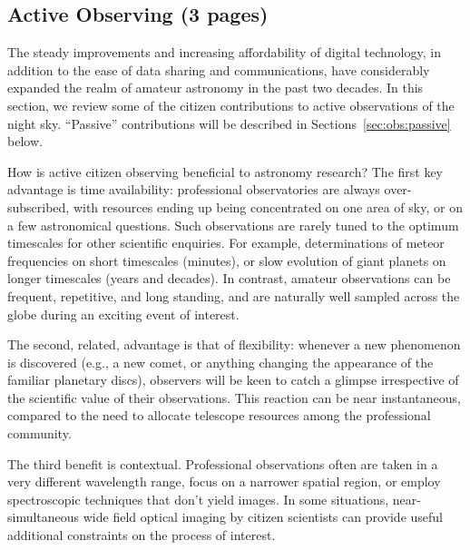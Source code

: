 \documentclass{ar2e}
\begin{document}
\subsection{Active Observing (3 pages)}
\label{sec:obs:active}

The steady improvements and increasing affordability of digital technology, in
addition to the ease of data sharing and communications, have considerably
expanded the realm of amateur astronomy in the past two decades.  
In this section, we review some of the citizen contributions to active
observations of the night sky.  ``Passive'' contributions 
will be described in Sections~\ref{sec:obs:passive} below.

How is active citizen observing beneficial to astronomy research?  The first
key advantage is time availability: professional observatories are always
over-subscribed, with resources ending up being concentrated on one area of
sky, or on a few astronomical questions.  Such observations are rarely tuned
to the optimum timescales for other scientific enquiries. For example,
determinations of meteor frequencies on short timescales (minutes), or slow
evolution of giant planets on longer timescales (years and decades).  In
contrast, amateur observations can be frequent, repetitive, and long standing,
and are naturally well sampled across the globe during an exciting event of
interest. 

The second, related, advantage is that of flexibility: whenever a new phenomenon
is discovered (e.g., a new comet, or anything changing the appearance of the
familiar planetary discs), observers will be keen to catch a glimpse
irrespective of the scientific value of their observations.  This reaction can
be near instantaneous, compared to the need to allocate telescope resources
among the professional community.  

The third benefit is contextual.  Professional observations often are taken in a
very different wavelength range, focus on a narrower spatial region, or employ
spectroscopic techniques that don't yield images. In some situations,
near-simultaneous wide field optical imaging by citizen scientists can provide
useful additional constraints on the process of interest.
\end{document}
